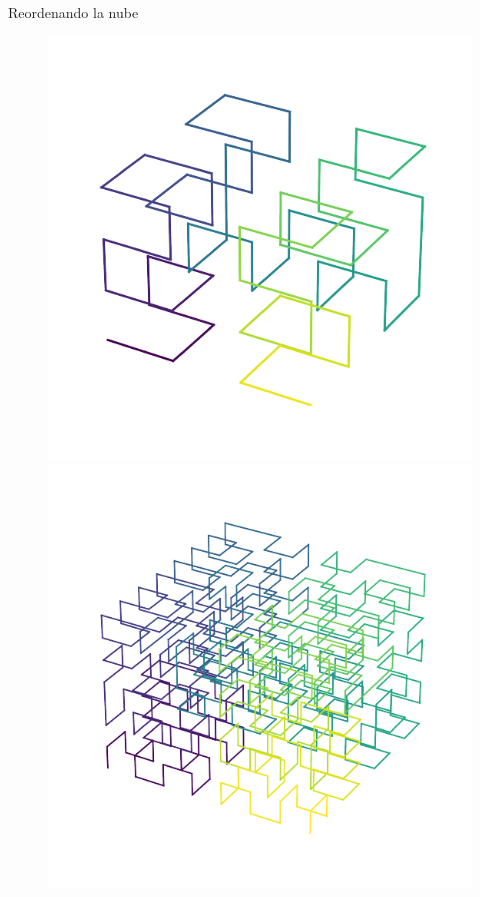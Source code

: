 \documentclass[aspectratio=169]{beamer}
\begin{document}
\begin{frame}{Reordenando la nube}
\begin{figure}[ht]
\begin{minipage}{0.3\linewidth}
        \includegraphics[width=0.85\linewidth]{img/plot_regular-4_hilbert.pdf}
      \end{minipage}
      \hfill
      \begin{minipage}{0.3\linewidth}
        \centering
        \includegraphics[width=0.85\linewidth]{img/plot_regular-8_hilbert.pdf}
      \end{minipage}
    \end{figure}
\end{frame}
\end{document}
